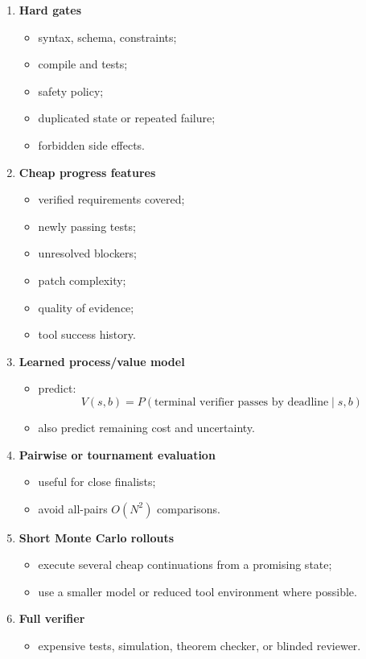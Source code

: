 \documentclass[
  letterpaper,
]{article}
\providecommand{\tightlist}{%
  \setlength{\itemsep}{0pt}\setlength{\parskip}{0pt}}
\begin{document}
\begin{enumerate}
\def\labelenumi{\arabic{enumi}.}
\tightlist
\item
  \textbf{Hard gates}

  \begin{itemize}
  \tightlist
  \item
    syntax, schema, constraints;
  \item
    compile and tests;
  \item
    safety policy;
  \item
    duplicated state or repeated failure;
  \item
    forbidden side effects.
  \end{itemize}
\item
  \textbf{Cheap progress features}

  \begin{itemize}
  \tightlist
  \item
    verified requirements covered;
  \item
    newly passing tests;
  \item
    unresolved blockers;
  \item
    patch complexity;
  \item
    quality of evidence;
  \item
    tool success history.
  \end{itemize}
\item
  \textbf{Learned process/value model}

  \begin{itemize}
  \tightlist
  \item
    predict:
    \[
    V(s,b)=P(\text{terminal verifier passes by deadline}\mid s,b)
    \]
  \item
    also predict remaining cost and uncertainty.
  \end{itemize}
\item
  \textbf{Pairwise or tournament evaluation}

  \begin{itemize}
  \tightlist
  \item
    useful for close finalists;
  \item
    avoid all-pairs \(O(N^2)\) comparisons.
  \end{itemize}
\item
  \textbf{Short Monte Carlo rollouts}

  \begin{itemize}
  \tightlist
  \item
    execute several cheap continuations from a promising state;
  \item
    use a smaller model or reduced tool environment where possible.
  \end{itemize}
\item
  \textbf{Full verifier}

  \begin{itemize}
  \tightlist
  \item
    expensive tests, simulation, theorem checker, or blinded reviewer.
  \end{itemize}
\end{enumerate}
\end{document}
